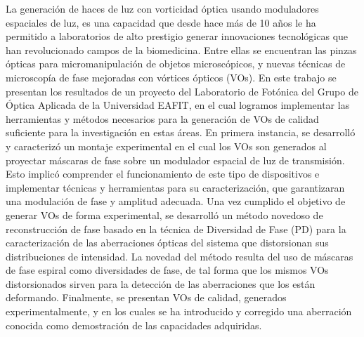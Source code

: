 




\begin{resumen}        %

La generación de haces de luz con vorticidad óptica usando moduladores
espaciales de luz, es una capacidad que desde hace 
más de 10 años le ha
permitido a laboratorios de alto prestigio generar
innovaciones tecnológicas que han revolucionado campos de la
biomedicina. Entre ellas se encuentran las pinzas
ópticas para micromanipulación de objetos microscópicos, y nuevas
técnicas de microscopía de fase mejoradas con vórtices ópticos (VOs).  
En este trabajo se presentan los resultados de un proyecto del Laboratorio de Fotónica del Grupo de Óptica Aplicada de
la Universidad EAFIT, en el cual logramos implementar las herramientas y métodos
necesarios para la generación de VOs de calidad suficiente para la
investigación en estas áreas. 
En primera instancia, se desarrolló y caracterizó un montaje experimental
en el cual los VOs son generados al proyectar máscaras de
fase sobre un modulador espacial de luz de transmisión. Esto implicó
comprender el funcionamiento de este tipo de dispositivos e
implementar técnicas y herramientas para su caracterización, que garantizaran una
modulación de fase y amplitud adecuada. Una vez cumplido el objetivo de generar VOs
de forma experimental, se desarrolló un método novedoso de reconstrucción de fase basado en
la técnica de Diversidad de Fase (PD) para la caracterización de las
aberraciones ópticas del sistema que distorsionan sus distribuciones de intensidad. La
novedad del método resulta del uso de máscaras de fase espiral como
diversidades de fase, de tal forma que los mismos VOs distorsionados sirven
para la detección de las aberraciones que los están deformando. 
Finalmente, se presentan VOs de calidad, generados experimentalmente, y en los cuales
se ha introducido y corregido una aberración conocida como
demostración de las capacidades adquiridas.
\end{resumen}





